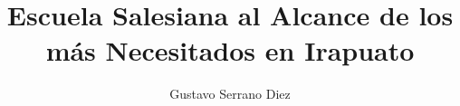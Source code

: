 \documentclass[spanish,12pt,letterpaper,titlepage]{report}
\author{Gustavo Serrano Diez}
\title{Escuela Salesiana al Alcance de los más Necesitados en Irapuato}
\begin{document}
\maketitle
\tableofcontents

















\nocite{*}


\listoftables
\listoffigures

\appendix



\end{document}
